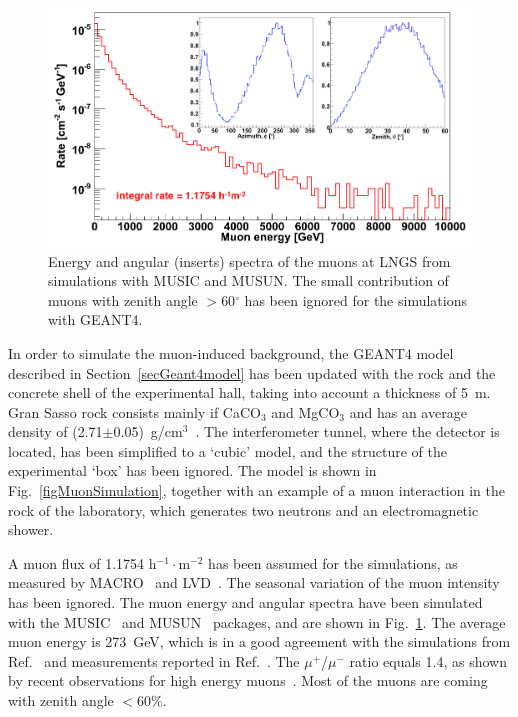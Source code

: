\begin{figure}[!t]
\centering
\includegraphics[width=0.8\linewidth]{plots/NRmuons/MuonSpectraAll.png}
\caption[Energy and angular spectra of the muons at LNGS from simulations with MUSIC and MUSUN]{Energy and angular (inserts) spectra of the muons at LNGS from simulations with MUSIC and MUSUN. The small contribution of muons with zenith angle $>$60$^{\circ}$ has been ignored for the simulations with GEANT4.}
\label{figMuonSpectra}
\end{figure}

In order to simulate the muon-induced background, the GEANT4 model described in Section~\ref{secGeant4model} has been updated with the rock and the concrete shell of the experimental hall, taking into account a thickness of 5~m. Gran Sasso rock consists mainly if CaCO$_{3}$ and MgCO$_{3}$ and has an average density of (2.71$\pm$0.05)~g/cm$^{3}$~\cite{LNGSrock}. The interferometer tunnel, where the detector is located, has been simplified to a `cubic' model, and the structure of the experimental `box' has been ignored. The model is shown in Fig.~\ref{figMuonSimulation}, together with an example of a muon interaction in the rock of the laboratory, which generates two neutrons and an electromagnetic shower.

A muon flux of 1.1754 h$^{-1}\cdot$m$^{-2}$ has been assumed for the simulations, as measured by MACRO~\cite{MuonIntensity_MACRO} and LVD~\cite{MuonIntensity_LVD}. The seasonal variation of the muon intensity~\cite{MuonSeasonalModulation} has been ignored. The muon energy and angular spectra have been simulated with the MUSIC~\cite{MUSIC} and MUSUN~\cite{MUSICandMUSUN} packages, and are shown in Fig.~\ref{figMuonSpectra}. The average muon energy is 273~GeV, which is in a good agreement with the simulations from Ref.~\cite{MeiHime} and measurements reported in Ref.~\cite{MuonIntensity_MACRO}.
The $\mu^{+}$/$\mu^{-}$ ratio equals 1.4, as shown by recent observations for high energy muons~\cite{MuonRatio}. Most of the muons are coming with zenith angle $<$60\%.

